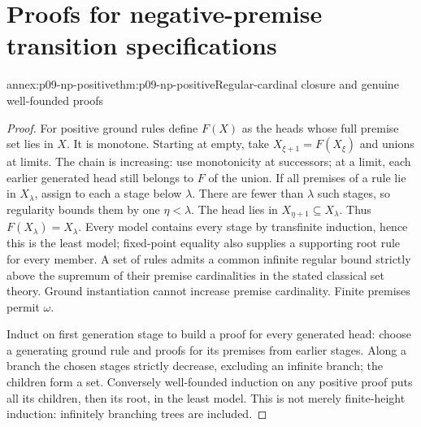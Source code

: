 \section{Proofs for negative-premise transition specifications}

\begin{annexitem}{annex:p09-np-positive}{thm:p09-np-positive}{Regular-cardinal closure and genuine well-founded proofs}
\begin{proof}
For positive ground rules define \(F(X)\) as the heads whose full
premise set lies in \(X\). It is monotone. Starting at empty,
take \(X_{\xi+1}=F(X_\xi)\) and unions at limits. The chain
is increasing: use monotonicity at successors; at a limit, each
earlier generated head still belongs to \(F\) of the union.
If all premises of a rule lie in \(X_\lambda\), assign to each
a stage below \(\lambda\). There are fewer than \(\lambda\)
such stages, so regularity bounds them by one \(\eta<\lambda\).
The head lies in \(X_{\eta+1}\subseteq X_\lambda\). Thus
\(F(X_\lambda)=X_\lambda\). Every model contains every stage
by transfinite induction, hence this is the least model; fixed-point
equality also supplies a supporting root rule for every member.
A set of rules admits a common infinite regular bound strictly
above the supremum of their premise cardinalities in the stated
classical set theory. Ground instantiation cannot increase premise
cardinality. Finite premises permit \(\omega\).

Induct on first generation stage to build a proof for every generated
head: choose a generating ground rule and proofs for its premises
from earlier stages. Along a branch the chosen stages strictly
decrease, excluding an infinite branch; the children form a set.
Conversely well-founded induction on any positive proof puts all
its children, then its root, in the least model. This is not merely
finite-height induction: infinitely branching trees are included.
\end{proof}
\end{annexitem}

